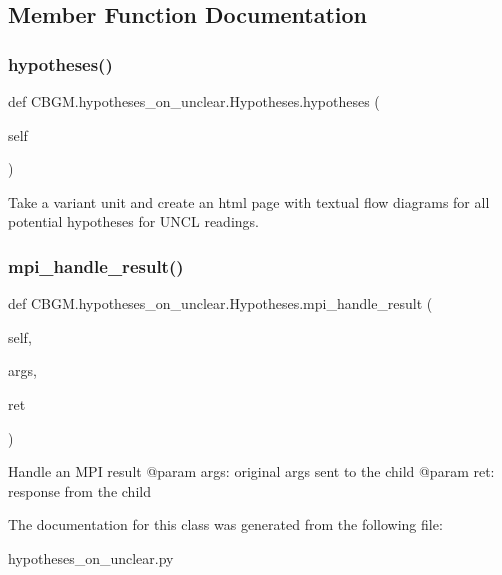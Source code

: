 \subsection{Member Function Documentation}
\mbox{\label{classCBGM_1_1hypotheses__on__unclear_1_1Hypotheses_a1a3028848ce6ab8da0dde0036194d42d}} 
\subsubsection{\texorpdfstring{hypotheses()}{hypotheses()}}
{\footnotesize\ttfamily def C\+B\+G\+M.\+hypotheses\+\_\+on\+\_\+unclear.\+Hypotheses.\+hypotheses (\begin{DoxyParamCaption}\item[{}]{self }\end{DoxyParamCaption})}

\begin{DoxyVerb}Take a variant unit and create an html page with textual flow diagrams for all
potential hypotheses for UNCL readings.
\end{DoxyVerb}
 \mbox{\label{classCBGM_1_1hypotheses__on__unclear_1_1Hypotheses_ac4520130ea50d36145e8bcd963ddc40d}} 
\subsubsection{\texorpdfstring{mpi\+\_\+handle\+\_\+result()}{mpi\_handle\_result()}}
{\footnotesize\ttfamily def C\+B\+G\+M.\+hypotheses\+\_\+on\+\_\+unclear.\+Hypotheses.\+mpi\+\_\+handle\+\_\+result (\begin{DoxyParamCaption}\item[{}]{self,  }\item[{}]{args,  }\item[{}]{ret }\end{DoxyParamCaption})}

\begin{DoxyVerb}Handle an MPI result
@param args: original args sent to the child
@param ret: response from the child
\end{DoxyVerb}
 

The documentation for this class was generated from the following file\+:\begin{DoxyCompactItemize}
\item 
hypotheses\+\_\+on\+\_\+unclear.\+py\end{DoxyCompactItemize}
